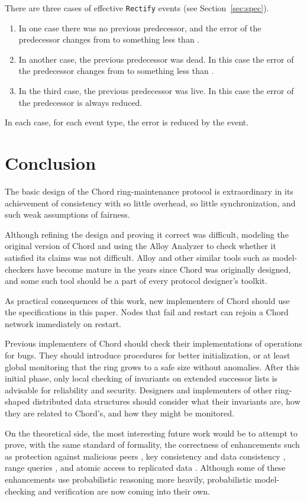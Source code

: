 \documentclass[conference]{IEEEtran}
\begin{document}
There are three cases of effective
\small
{\tt Rectify}
\normalsize
events (see Section~\ref{sec:spec}).
\begin{enumerate}
\item
In one case there was no previous predecessor, and the error of
the predecessor changes from  to something less than .
\item
In another case,
the previous predecessor was dead.
In this case the error of
the predecessor changes from  to something less than .
\item
In the third case,
the previous predecessor was live.
In this case the error of
the predecessor is always reduced.
\end{enumerate}
In each case, for each event type, the error is reduced by the event.


\section{Conclusion}

The basic design of the Chord ring-maintenance protocol is 
extraordinary in its achievement of consistency with so little
overhead, so little synchronization, and such weak assumptions of
fairness.

Although refining the design and proving it correct
was difficult, modeling the original version of Chord and using
the Alloy Analyzer to check whether it satisfied its claims was not
difficult.
Alloy and other similar tools such as model-checkers have become
mature in the years since Chord was originally designed, and some
such tool should be a part of every protocol designer's toolkit.

As practical consequences of this work, new implementers of
Chord should use the specifications in this
paper.
Nodes that fail and restart can rejoin a Chord network immediately
on restart.

Previous implementers of Chord should
check their implementations of operations
for bugs.
They should introduce procedures for better initialization,
or at least global monitoring that the ring grows to a safe size without
anomalies.
After this initial phase, only local checking of invariants on
extended successor lists is advisable for reliability and security.
Designers and implementers of other ring-shaped distributed
data structures should consider what their invariants are,
how they are related to Chord's, and how they might be monitored.

On the theoretical side,
the most interesting future work would be to attempt to prove,
with the same standard of formality, the
correctness of enhancements such as
protection against malicious peers
\cite{awerbuch-robust,chord-byz,sechord},
key consistency and data consistency \cite{scatter},
range queries \cite{rangequeries},
and atomic access to replicated data \cite{atomicchord,etna}.
Although some of these enhancements use probabilistic reasoning
more heavily, 
probabilistic model-checking and verification are now coming into
their own.
\end{document}
